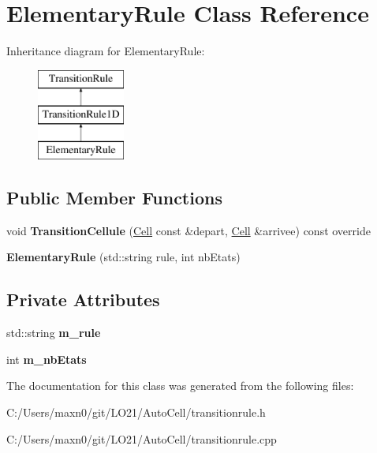 \hypertarget{class_elementary_rule}{}\section{Elementary\+Rule Class Reference}
\label{class_elementary_rule}
Inheritance diagram for Elementary\+Rule\+:\begin{figure}[H]
\begin{center}
\leavevmode
\includegraphics[height=3.000000cm]{class_elementary_rule}
\end{center}
\end{figure}
\subsection*{Public Member Functions}
\begin{DoxyCompactItemize}
\item 
\mbox{\label{class_elementary_rule_a38451269153546c9d374f7f6df8cde6d}} 
void {\bfseries Transition\+Cellule} (\mbox{\hyperlink{class_cell}{Cell}} const \&depart, \mbox{\hyperlink{class_cell}{Cell}} \&arrivee) const override
\item 
\mbox{\label{class_elementary_rule_abcf6f8601c5ad393ee7e2a565e879f48}} 
{\bfseries Elementary\+Rule} (std\+::string rule, int nb\+Etats)
\end{DoxyCompactItemize}
\subsection*{Private Attributes}
\begin{DoxyCompactItemize}
\item 
\mbox{\label{class_elementary_rule_a08733bd5dfc8395606006d513972f6c0}} 
std\+::string {\bfseries m\+\_\+rule}
\item 
\mbox{\label{class_elementary_rule_ade6ba3729cf8282c3b422a29b7c57a88}} 
int {\bfseries m\+\_\+nb\+Etats}
\end{DoxyCompactItemize}


The documentation for this class was generated from the following files\+:\begin{DoxyCompactItemize}
\item 
C\+:/\+Users/maxn0/git/\+L\+O21/\+Auto\+Cell/transitionrule.\+h\item 
C\+:/\+Users/maxn0/git/\+L\+O21/\+Auto\+Cell/transitionrule.\+cpp\end{DoxyCompactItemize}
